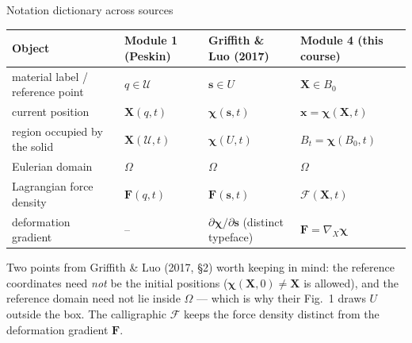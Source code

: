 \documentclass[aspectratio=169,11pt]{beamer}
\newcommand{\xvec}{\bm{x}}
\newcommand{\Xvec}{\bm{X}}
\newcommand{\Ften}{\bm{F}}
\newcommand{\lforce}{\bm{\mathcal{F}}}
\begin{document}
\begin{frame}{Notation dictionary across sources}
\footnotesize
\renewcommand{\arraystretch}{1.22}
\begin{tabularx}{\textwidth}{
  >{\raggedright\arraybackslash}p{}
  >{\centering\arraybackslash}p{}
  >{\centering\arraybackslash}p{}
  >{\centering\arraybackslash}X}
\toprule
Object & Module 1 (Peskin) & Griffith \& Luo (2017) & Module 4 (this course) \\
\midrule
material label / reference point & \(q\in\mathcal{U}\) & \(\bm{s}\in U\) & \(\Xvec\in B_0\) \\
current position & \(\bm{X}(q,t)\) & \(\bm{\chi}(\bm{s},t)\) & \(\xvec=\bm{\chi}(\Xvec,t)\) \\
region occupied by the solid & \(\bm{X}(\mathcal{U},t)\) & \(\bm{\chi}(U,t)\) & \(B_t=\bm{\chi}(B_0,t)\) \\
Eulerian domain & \(\Omega\) & \(\Omega\) & \(\Omega\) \\
Lagrangian force density & \(\bm{F}(q,t)\) & \(\bm{F}(\bm{s},t)\) & \(\lforce(\Xvec,t)\) \\
deformation gradient & -- & \(\partial\bm{\chi}/\partial\bm{s}\) (distinct typeface) & \(\Ften=\nabla_{\!X}\bm{\chi}\) \\
\bottomrule
\end{tabularx}

\medskip
\begin{punchbox}
\scriptsize
Two points from Griffith \& Luo (2017, \S2) worth keeping in mind: the reference coordinates need \emph{not} be the initial positions (\(\bm{\chi}(\Xvec,0)\neq\Xvec\) is allowed), and the reference domain need not lie inside \(\Omega\) --- which is why their Fig.~1 draws \(U\) outside the box. The calligraphic \(\lforce\) keeps the force density distinct from the deformation gradient \(\Ften\).
\end{punchbox}
\end{frame}
\end{document}
